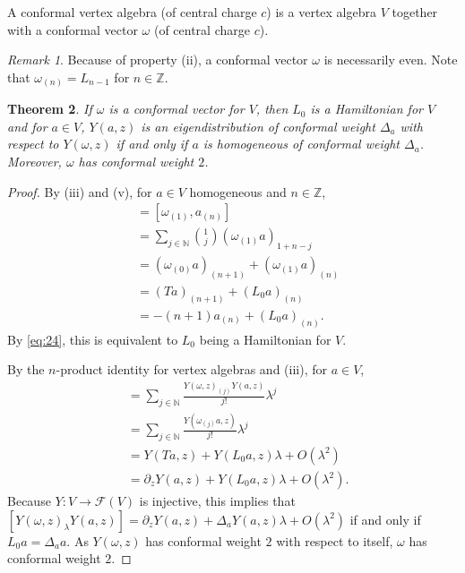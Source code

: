 \documentclass[a4paper, 12pt, reqno]{amsart}
\newtheorem{theorem}{Theorem}[subsection]
\theoremstyle{remark}
\newtheorem{remark}[theorem]{Remark}
\numberwithin{equation}{subsection}
\begin{document}
A conformal vertex algebra (of central charge $c$) is a vertex algebra $V$ together with a conformal vector $\omega$ (of central charge $c$).

\begin{remark}
  \label{rmk:15}
  Because of property (ii), a conformal vector $\omega$ is necessarily even.
  Note that $\omega_{(n)} = L_{n - 1}$ for $n \in \mathbb{Z}$.
\end{remark}

\begin{theorem}
  \label{thr:17}
  If $\omega$ is a conformal vector for $V$, then $L_0$ is a Hamiltonian for $V$ and for $a \in V$, $Y(a, z)$ is an eigendistribution of conformal weight $\Delta_a$ with respect to $Y(\omega, z)$ if and only if $a$ is homogeneous of conformal weight $\Delta_a$.
  Moreover, $\omega$ has conformal weight $2$.
\end{theorem}

\begin{proof}
  By (iii) and (v), for $a \in V$ homogeneous and $n \in \mathbb{Z}$,
  \begin{align*}
    [L_0, a_{(n)}] &= [\omega_{(1)}, a_{(n)}] \\
    &= \sum_{j \in \mathbb{N}}\binom{1}{j}(\omega_{(1)}a)_{1 + n - j} \\
    &= (\omega_{(0)}a)_{( n + 1)} + (\omega_{(1)}a)_{(n)} \\
    &= (Ta)_{(n + 1)} + (L_0a)_{(n)} \\
    &= -(n + 1)a_{(n)} + (L_0a)_{(n)}.
  \end{align*}
  By \eqref{eq:24}, this is equivalent to $L_0$ being a Hamiltonian for $V$.

  By the $n$-product identity for vertex algebras and (iii), for $a \in V$,
  \begin{align*}
    [Y(\omega, z)_{\lambda}Y(a, z)] &= \sum_{j \in \mathbb{N}}\frac{Y(\omega, z)_{(j)}Y(a, z)}{j!}\lambda^j \\
    &= \sum_{j \in \mathbb{N}}\frac{Y(\omega_{(j)}a, z)}{j!}\lambda^j \\
    &= Y(Ta, z) + Y(L_0a, z)\lambda + O(\lambda^2) \\
    &= \partial_zY(a, z) + Y(L_0a, z)\lambda + O(\lambda^2).
  \end{align*}
  Because $Y: V \to \mathcal{F}(V)$ is injective, this implies that $[Y(\omega, z)_{\lambda}Y(a, z)] = \partial_zY(a, z) + \Delta_aY(a, z)\lambda + O(\lambda^2)$ if and only if $L_0a = \Delta_aa$.
  As $Y(\omega, z)$ has conformal weight $2$ with respect to itself, $\omega$ has conformal weight $2$.
\end{proof}
\end{document}
